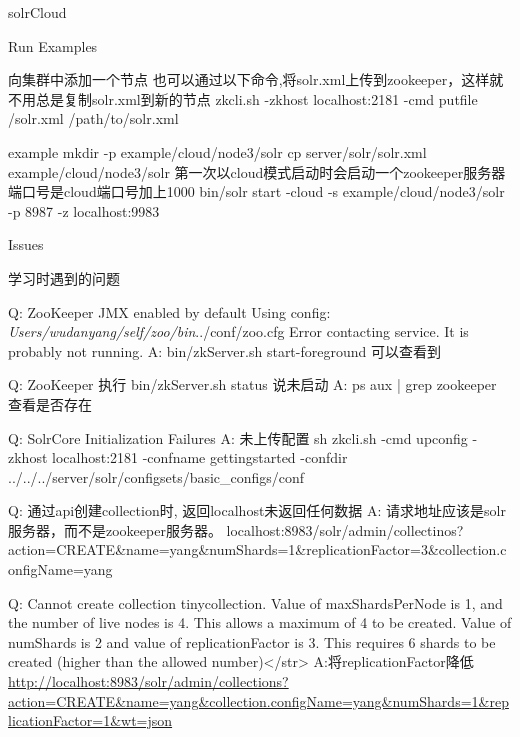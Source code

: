 \documentclass[presentation]{beamer}
\begin{document}
\begin{frame}[fragile,label={sec:org80f600b}]{solrCloud}
\begin{block}{Run Examples}
\begin{block}{向集群中添加一个节点}
也可以通过以下命令,将solr.xml上传到zookeeper，这样就不用总是复制solr.xml到新的节点
zkcli.sh -zkhost localhost:2181 -cmd putfile /solr.xml /path/to/solr.xml

\begin{block}{example}
mkdir -p example/cloud/node3/solr
cp server/solr/solr.xml example/cloud/node3/solr
第一次以cloud模式启动时会启动一个zookeeper服务器端口号是cloud端口号加上1000
bin/solr start -cloud -s example/cloud/node3/solr -p 8987 -z localhost:9983
\end{block}
\end{block}
\end{block}
\end{frame}
\begin{frame}[label={sec:org7c8b5bf}]{Issues}
\begin{block}{学习时遇到的问题}
\begin{block}{Q: ZooKeeper JMX enabled by default Using config: \emph{Users/wudanyang/self/zoo/bin}../conf/zoo.cfg Error contacting service. It is probably not running.}
A: bin/zkServer.sh start-foreground 可以查看到
\end{block}

\begin{block}{Q: ZooKeeper 执行 bin/zkServer.sh status 说未启动}
A: ps aux | grep zookeeper
查看是否存在
\end{block}

\begin{block}{Q: SolrCore Initialization Failures}
A: 未上传配置
sh zkcli.sh -cmd upconfig -zkhost localhost:2181 -confname gettingstarted -confdir ../../../server/solr/configsets/basic\_configs/conf
\end{block}


\begin{block}{Q: 通过api创建collection时, 返回localhost未返回任何数据}
A: 请求地址应该是solr服务器，而不是zookeeper服务器。
localhost:8983/solr/admin/collectinos?action=CREATE\&name=yang\&numShards=1\&replicationFactor=3\&collection.configName=yang
\end{block}


\begin{block}{Q: Cannot create collection tinycollection. Value of maxShardsPerNode is 1, and the number of live nodes is 4. This allows a maximum of 4 to be created. Value of numShards is 2 and value of replicationFactor is 3. This requires 6 shards to be created (higher than the allowed number)</str>}
A:将replicationFactor降低
\url{http://localhost:8983/solr/admin/collections?action=CREATE\&name=yang\&collection.configName=yang\&numShards=1\&replicationFactor=1\&wt=json}
\end{block}



\end{block}
\end{frame}
\end{document}
